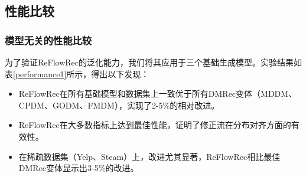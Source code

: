\documentclass[sigconf]{acmart}
\begin{document}
\subsection{性能比较}
\subsubsection{\textbf{模型无关的性能比较}}
为了验证\textsf{ReFlowRec}的泛化能力，我们将其应用于三个基础生成模型。实验结果如表\ref{performance1}所示，得出以下发现：

\begin{itemize}[leftmargin=*]
    \item \textsf{ReFlowRec}在所有基础模型和数据集上一致优于所有DMRec变体（MDDM、CPDM、GODM、FMDM），实现了2-5\%的相对改进。
    \item \textsf{ReFlowRec}在大多数指标上达到最佳性能，证明了修正流在分布对齐方面的有效性。
    \item 在稀疏数据集（Yelp、Steam）上，改进尤其显著，\textsf{ReFlowRec}相比最佳DMRec变体显示出3-5\%的改进。
\end{itemize}
\end{document}
